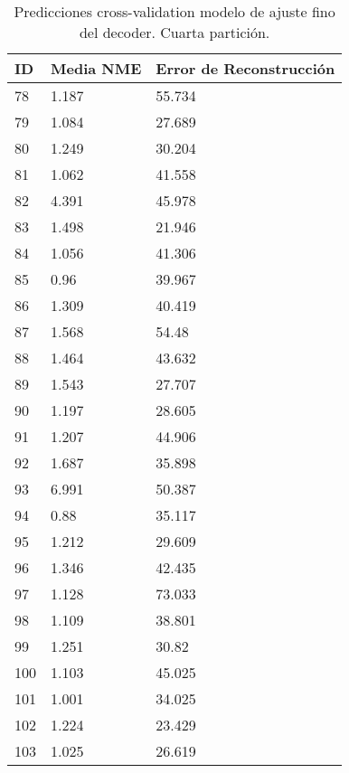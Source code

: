 \begin{table}[!ht]
    \centering
    \caption{Predicciones cross-validation modelo de ajuste fino del  decoder. Cuarta partición.}
    \begin{tabular}{|l|l|l|}
    \hline
    \cellcolor{gray!25}\textbf{ID} & \cellcolor{gray!25}\textbf{Media NME} & \cellcolor{gray!25}\textbf{Error de Reconstrucción}\\ \hline
        78 & 1.187 & 55.734 \\ \hline
        79 & 1.084 & 27.689 \\ \hline
        80 & 1.249 & 30.204 \\ \hline
        81 & 1.062 & 41.558 \\ \hline
        82 & 4.391 & 45.978 \\ \hline
        83 & 1.498 & 21.946 \\ \hline
        84 & 1.056 & 41.306 \\ \hline
        85 & 0.96 & 39.967 \\ \hline
        86 & 1.309 & 40.419 \\ \hline
        87 & 1.568 & 54.48 \\ \hline
        88 & 1.464 & 43.632 \\ \hline
        89 & 1.543 & 27.707 \\ \hline
        90 & 1.197 & 28.605 \\ \hline
        91 & 1.207 & 44.906 \\ \hline
        92 & 1.687 & 35.898 \\ \hline
        93 & 6.991 & 50.387 \\ \hline
        94 & 0.88 & 35.117 \\ \hline
        95 & 1.212 & 29.609 \\ \hline
        96 & 1.346 & 42.435 \\ \hline
        97 & 1.128 & 73.033 \\ \hline
        98 & 1.109 & 38.801 \\ \hline
        99 & 1.251 & 30.82 \\ \hline
        100 & 1.103 & 45.025 \\ \hline
        101 & 1.001 & 34.025 \\ \hline
        102 & 1.224 & 23.429 \\ \hline
        103 & 1.025 & 26.619 \\ \hline
    \end{tabular}
    \label{table:Daugmentation_images_4}
\end{table}

